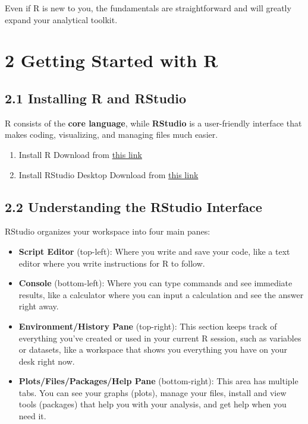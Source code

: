 \documentclass[
  letterpaper,
  DIV=11,
  numbers=noendperiod]{scrreprt}
\begin{document}
Even if R is new to you, the fundamentals are straightforward and will
greatly expand your analytical toolkit.

\section*{2 Getting Started with R}\label{getting-started-with-r}


\subsection*{2.1 Installing R and
RStudio}\label{installing-r-and-rstudio}

R consists of the \textbf{core language}, while \textbf{RStudio} is a
user-friendly interface that makes coding, visualizing, and managing
files much easier.

\begin{enumerate}
\def\labelenumi{\arabic{enumi}.}
\item
  Install R Download from \href{https://cran.r-project.org/}{this link}
\item
  Install RStudio Desktop Download from
  \href{https://posit.co/download/rstudio-desktop/}{this link}
\end{enumerate}

\subsection*{2.2 Understanding the RStudio
Interface}\label{understanding-the-rstudio-interface}

RStudio organizes your workspace into four main panes:

\begin{itemize}
\item
  \textbf{Script Editor} (top-left): Where you write and save your code,
  like a text editor where you write instructions for R to follow.
\item
  \textbf{Console} (bottom-left): Where you can type commands and see
  immediate results, like a calculator where you can input a calculation
  and see the answer right away.
\item
  \textbf{Environment/History Pane} (top-right): This section keeps
  track of everything you've created or used in your current R session,
  such as variables or datasets, like a workspace that shows you
  everything you have on your desk right now.
\item
  \textbf{Plots/Files/Packages/Help Pane} (bottom-right): This area has
  multiple tabs. You can see your graphs (plots), manage your files,
  install and view tools (packages) that help you with your analysis,
  and get help when you need it.
\end{itemize}
\end{document}
